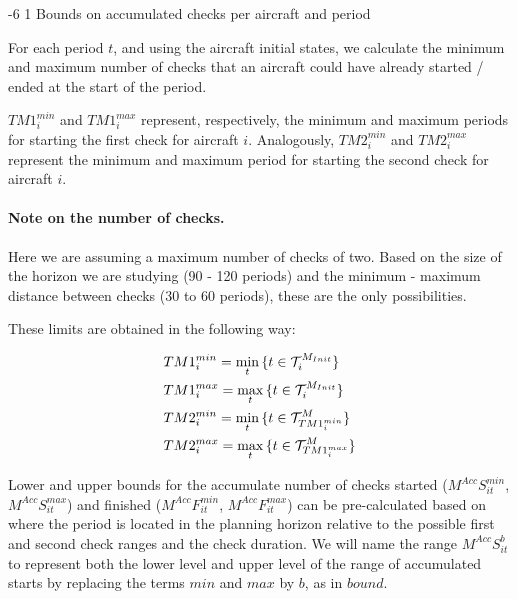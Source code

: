 \documentclass[a4paper,onecolumn,fleqn]{article}
\makeatletter
\renewcommand\section{\@startsection{section}{1}{\z@}%
                       {-6\p@ \@plus -0\p@ \@minus -0\p@}%
                       {2\p@ \@plus 0\p@ \@minus 0\p@}%
                       {\normalsize\textbf}}
\renewcommand\section{\@startsection{section}{2}{\z@}%
                       {-6\p@ \@plus -0\p@ \@minus -0\p@}%
                       {2\p@ \@plus 0\p@ \@minus 0\p@}%
                       {\normalsize\textbf}}
\renewcommand\section{\@startsection{section}{3}{\z@}%
                       {-6\p@ \@plus -0\p@ \@minus -0\p@}%
                       {1\p@ \@plus 0\p@ \@minus 0\p@}%
                       {\normalsize\itshape\bfseries}}
\makeatother
\begin{document}
\section{Bounds on accumulated checks per aircraft and period} \label{sec:rangechecksaircraft}

  For each period $t$, and using the aircraft initial states, we calculate the minimum and maximum number of checks that an aircraft could have already started / ended at the start of the period.

  $TM1^{min}_i$ and $TM1^{max}_i$ represent, respectively, the minimum and maximum periods for starting the first check for aircraft $i$. Analogously, $TM2^{min}_i$ and $TM2^{max}_i$ represent the minimum and maximum period for starting the second check for aircraft $i$.

  \paragraph{Note on the number of checks.} Here we are assuming a maximum number of checks of two. Based on the size of the horizon we are studying (90 - 120 periods) and the minimum - maximum distance between checks (30 to 60 periods), these are the only possibilities.

  These limits are obtained in the following way:

  \begin{align}
  	& TM1^{min}_i = \min_t{\{t \in \mathcal{T}^{M_{Init}}_i\}}   \notag\\
    & TM1^{max}_i = \max_t{\{t \in \mathcal{T}^{M_{Init}}_i\}}   \notag \\
    & TM2^{min}_i = \min_t{\{t \in \mathcal{T}^M_{TM1^{min}_i}\}}\notag \\
    & TM2^{max}_i = \max_t{\{t \in \mathcal{T}^M_{TM1^{max}_i}\}}\notag %
  \end{align}

  Lower and upper bounds for the accumulate number of checks started ($M^{Acc}S^{min}_{it}$, $M^{Acc}S^{max}_{it}$) and finished ($M^{Acc}F^{min}_{it}$, $M^{Acc}F^{max}_{it}$) can be pre-calculated based on where the period is located in the planning horizon relative to the possible first and second check ranges and the check duration. We will name the range $M^{Acc}S^{b}_{it}$ to represent both the lower level and upper level of the range of accumulated starts by replacing the terms $min$ and $max$ by $b$, as in $bound$.
\end{document}
